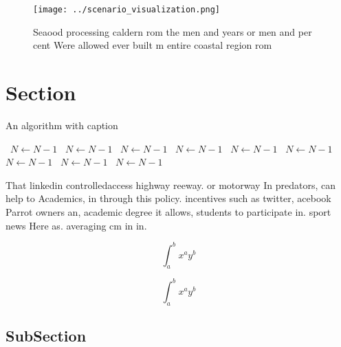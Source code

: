\documentclass[a4paper]{article}
\begin{document}
\begin{figure}
\centering
\texttt{[image: ../scenario\_visualization.png]}
\caption{Seaood processing caldern rom the men and years or men and per cent Were allowed ever built m entire coastal region rom
}
\end{figure}
 
\section{Section}

\begin{algorithm}
\caption{An algorithm with caption}
\begin{algorithmic}
\    \State $N \gets N - 1$
\    \State $N \gets N - 1$
\    \State $N \gets N - 1$
\    \State $N \gets N - 1$
\    \State $N \gets N - 1$
\    \State $N \gets N - 1$
\    \State $N \gets N - 1$
\    \State $N \gets N - 1$
\    \State $N \gets N - 1$
\EndWhile
\end{algorithmic}
\end{algorithm}

That linkedin controlledaccess highway reeway. or motorway In predators, can help to Academics, in through this policy. incentives such as twitter, acebook Parrot owners an, academic degree it allows, students to participate in. sport news Here as. averaging cm in in. 

\[ \int_{a}^{b}{x^{a}y^{b}} \]

\[ \int_{a}^{b}{x^{a}y^{b}} \]

\subsection{SubSection}
\end{document}
